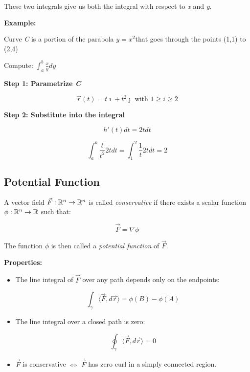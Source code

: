 These two integrals give us both the integral with respect to \emph{x} and \emph{y}.
\vspace{\baselineskip}

\textbf{Example:}
\vspace{\baselineskip}

Curve \emph{C} is a portion of the parabola \(y = x^2\)that goes through the points (1,1) to (2,4)
\vspace{\baselineskip}

Compute: \(\int_{a}^{b} \frac{x}{y} dy\)
\vspace{\baselineskip}

\textbf{Step 1: Parametrize \emph{C}}

\[
    \vec{r}(t) = t\imath + t^2 \jmath \text{ with } 1 \ge i \ge 2
\]

\textbf{Step 2: Substitute into the integral}

\[
    h'(t)dt= 2t dt
\]

\[
    \int_{a}^{b} \frac{t}{t^2} 2tdt = \int_{1}^{2} \frac{1}{t} 2tdt = 2 
\]

\subsection{Potential Function}

A vector field \( \vec{F} : \mathbb{R}^n \to \mathbb{R}^n \) is called \emph{conservative} if there exists a 
scalar function \( \phi : \mathbb{R}^n \to \mathbb{R} \) such that:

\[
    \vec{F} = \nabla \phi
\]

The function \( \phi \) is then called a \emph{potential function} of \( \vec{F} \).
\vspace{\baselineskip}

\textbf{Properties:}

\begin{itemize}

    \item The line integral of \( \vec{F} \) over any path depends only on the endpoints:

        \[
            \int_\gamma \langle \vec{F}, d\vec{r} \rangle = \phi(B) - \phi(A)
        \]

    \item The line integral over a closed path is zero:

        \[
            \oint_\gamma \langle \vec{F}, d\vec{r} \rangle = 0
        \]

    \item \( \vec{F} \) is conservative \( \Leftrightarrow \) \( \vec{F} \) has zero curl in a 
    simply connected region.

\end{itemize}

